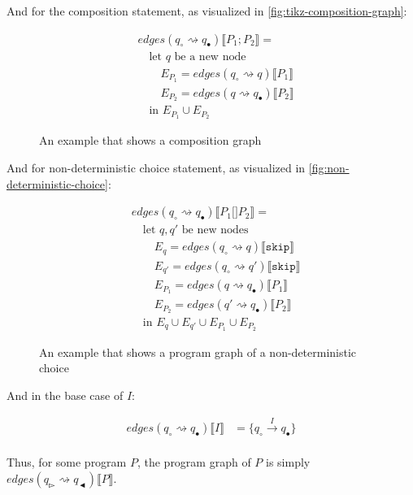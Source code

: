 And for the composition statement, as visualized in \autoref{fig:tikz-composition-graph}:

\begin{equation}
    \begin{split}
        &edges(q_\circ \rightsquigarrow q_\bullet) \lBrack P_1; P_2 \rBrack = \\
        &\quad \text{let } q \text{ be a new node} \\
        &\quad\quad E_{P_1} = edges(q_\circ \rightsquigarrow q) \lBrack P_1 \rBrack \\
        &\quad\quad E_{P_2} = edges(q \rightsquigarrow q_\bullet) \lBrack P_2 \rBrack \\
        &\quad \text{in } E_{P_1} \cup E_{P_2}
    \end{split}\label{eq:equation10}
\end{equation}


\begin{figure}
    \center
    
    \caption{An example that shows a composition graph}
    \label{fig:tikz-composition-graph}
\end{figure}


And for non-deterministic choice statement, as visualized in \autoref{fig:non-deterministic-choice}:


\begin{equation}
    \begin{split}
        &edges(q_\circ \rightsquigarrow q_\bullet) \lBrack P_1 \texttt{[]} P_2 \rBrack = \\
        &\quad \text{let } q, q' \text{ be new nodes} \\
        &\quad\quad E_{q} = edges(q_\circ \rightsquigarrow q) \lBrack \texttt{skip} \rBrack \\
        &\quad\quad E_{q'} = edges(q_\circ \rightsquigarrow q') \lBrack \texttt{skip} \rBrack \\
        &\quad\quad E_{P_1}= edges(q \rightsquigarrow q_\bullet) \lBrack P_1 \rBrack \\
        &\quad\quad E_{P_2}= edges(q' \rightsquigarrow q_\bullet) \lBrack P_2 \rBrack \\
        &\quad \text{in } E_{q} \cup E_{q'} \cup E_{P_1} \cup E_{P_2}
    \end{split}\label{eq:equation13}
\end{equation}

\begin{figure}[htb!]
    \center
    
    \caption{An example that shows a program graph of a non-deterministic choice}
    \label{fig:non-deterministic-choice}
\end{figure}

And in the base case of $I$:

\begin{align}
    edges(q_\circ \rightsquigarrow q_\bullet) \lBrack I \rBrack &= \{q_\circ \xrightarrow{I} q_\bullet\}\label{eq:equation11} \\
\end{align}

Thus, for some program $P$, the program graph of $P$ is simply $edges(q_\whitepointerright \rightsquigarrow q_\blackpointerleft)\lBrack P \rBrack$.
